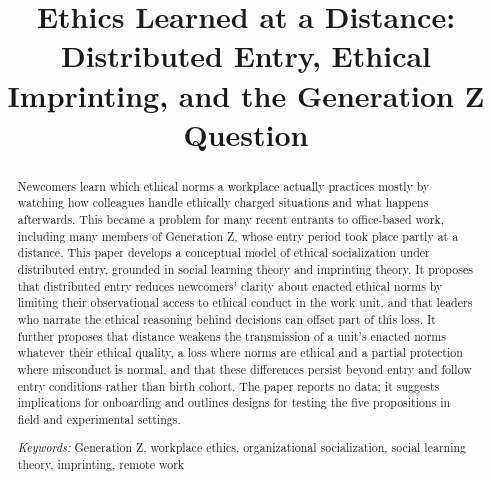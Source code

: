 \documentclass[12pt,a4paper]{article}
\title{Ethics Learned at a Distance: Distributed Entry, Ethical Imprinting, and the Generation Z Question}
\author{}
\date{}
\theoremstyle{definition}
\begin{document}
\maketitle
\vspace{-2em}

\begin{abstract}
\noindent Newcomers learn which ethical norms a workplace actually practices mostly by watching how colleagues handle ethically charged situations and what happens afterwards. This became a problem for many recent entrants to office-based work, including many members of Generation Z, whose entry period took place partly at a distance. This paper develops a conceptual model of ethical socialization under distributed entry, grounded in social learning theory and imprinting theory. It proposes that distributed entry reduces newcomers' clarity about enacted ethical norms by limiting their observational access to ethical conduct in the work unit, and that leaders who narrate the ethical reasoning behind decisions can offset part of this loss. It further proposes that distance weakens the transmission of a unit's enacted norms whatever their ethical quality, a loss where norms are ethical and a partial protection where misconduct is normal, and that these differences persist beyond entry and follow entry conditions rather than birth cohort. The paper reports no data; it suggests implications for onboarding and outlines designs for testing the five propositions in field and experimental settings.

\medskip
\noindent\textit{Keywords:} Generation Z, workplace ethics, organizational socialization, social learning theory, imprinting, remote work
\end{abstract}










\end{document}
